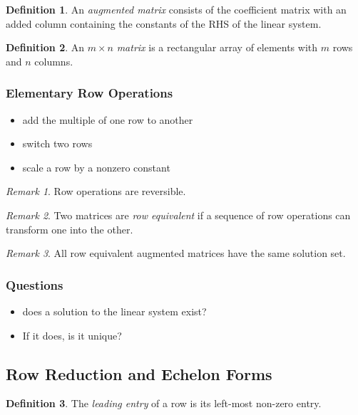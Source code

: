 \documentclass{article}
\theoremstyle{definition}
\newtheorem{definition}{Definition}[section]
\theoremstyle{remark}
\newtheorem*{remark}{Remark}
\theoremstyle{remark}
\theoremstyle{remark}
\newtheorem*{it follows}{It follows}
\begin{document}
\begin{definition}
  An \textit{augmented matrix} consists of the coefficient matrix with an added column containing the constants of the RHS of the linear system.
\end{definition}

\begin{definition}
  An $m \times n$ \textit{matrix} is a rectangular array of elements with $m$ rows and $n$ columns.
\end{definition}

\subsubsection{Elementary Row Operations}

\begin{itemize}
  \item add the multiple of one row to another
  \item switch two rows
  \item scale a row by a nonzero constant
\end{itemize}

\begin{remark}
  Row operations are reversible.
\end{remark}

\begin{remark}
  Two matrices are \textit{row equivalent} if a sequence of row operations can transform one into the other.
\end{remark}

\begin{remark}
  All row equivalent augmented matrices have the same solution set.
\end{remark}

\subsubsection{Questions}
\begin{itemize}
  \item does a solution to the linear system exist?
  \item If it does, is it unique?
\end{itemize}

\subsection{Row Reduction and Echelon Forms}

  \begin{definition}
    The \textit{leading entry} of a row is its left-most non-zero entry.
  \end{definition}
\end{document}
